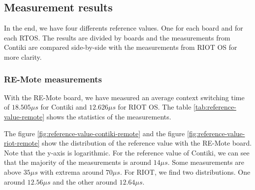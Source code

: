 \subsection{Measurement results}

In the end, we have four differents reference values.
One for each board and for each RTOS.
The results are divided by boards and the measurements from Contiki are compared side-by-side with the measurements from RIOT OS for more clarity.

\subsubsection{RE-Mote measurements}
With the RE-Mote board, we have measured an average context switching time of $18.505\mu s$ for Contiki and $12.626 \mu s$ for RIOT OS.
The table \ref{tab:reference-value-remote} shows the statistics of the measurements.



The figure \ref{fig:reference-value-contiki-remote} and the figure \ref{fig:reference-value-riot-remote} show the distribution of the reference value with the RE-Mote board.
Note that the y-axis is logarithmic.
For the reference value of Contiki, we can see that the majority of the measurements is around $14 \mu s$.
Some measurements are above $35 \mu s$ with extrema around $70 \mu s$.
For RIOT, we find two distributions.
One around $12.56\mu s$ and the other around $12.64\mu s$.

